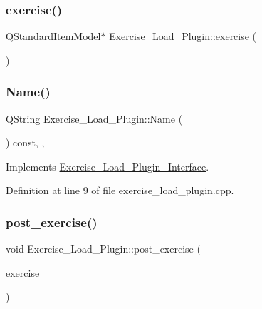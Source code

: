 \subsubsection{\texorpdfstring{exercise()}{exercise()}}
{\footnotesize\ttfamily Q\+Standard\+Item\+Model$\ast$ Exercise\+\_\+\+Load\+\_\+\+Plugin\+::exercise (\begin{DoxyParamCaption}{ }\end{DoxyParamCaption})\hspace{0.3cm}{\ttfamily [private]}}

\mbox{\label{classExercise__Load__Plugin_af6226d33bef2f1f526a8f37ec33e431c}} 
\subsubsection{\texorpdfstring{Name()}{Name()}}
{\footnotesize\ttfamily Q\+String Exercise\+\_\+\+Load\+\_\+\+Plugin\+::\+Name (\begin{DoxyParamCaption}{ }\end{DoxyParamCaption}) const\hspace{0.3cm}{\ttfamily [override]}, {\ttfamily [private]}, {\ttfamily [virtual]}}



Implements \hyperlink{classExercise__Load__Plugin__Interface_ab6899b947c3890e73b8a64b3c76c60de}{Exercise\+\_\+\+Load\+\_\+\+Plugin\+\_\+\+Interface}.



Definition at line 9 of file exercise\+\_\+load\+\_\+plugin.\+cpp.

\mbox{\label{classExercise__Load__Plugin_ad0c7c810dd492a014e17d40cdfe3d35d}} 
\subsubsection{\texorpdfstring{post\+\_\+exercise()}{post\_exercise()}}
{\footnotesize\ttfamily void Exercise\+\_\+\+Load\+\_\+\+Plugin\+::post\+\_\+exercise (\begin{DoxyParamCaption}\item[{Q\+Standard\+Item\+Model $\ast$}]{exercise }\end{DoxyParamCaption})\hspace{0.3cm}{\ttfamily [virtual]}}



